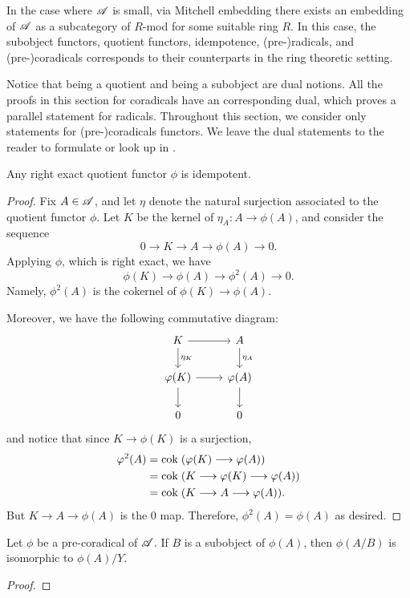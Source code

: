 \begin{rmk}
In the case where $\mathscr{A}$ is small, via Mitchell embedding 
there exists an embedding of $\mathscr{A}$ as a subcategory of $R$-mod
for some suitable ring $R$. In this case, the subobject functors, 
quotient functors, idempotence, (pre-)radicals, and 
(pre-)coradicals corresponds to their counterparts in the ring 
theoretic setting.
\end{rmk}

\begin{rmk}
Notice that being a quotient and being a subobject are dual 
notions. All the proofs in this section for coradicals have an 
corresponding dual, which proves a parallel statement for radicals.
Throughout this section, we consider only statements for 
(pre-)coradicals functors. We leave the dual statements to the 
reader to formulate or look up in \cite{DTor}.
\end{rmk}

\begin{prop}
Any right exact quotient functor $\phi$ is idempotent. 
\end{prop}
\begin{proof}
Fix $A \in \mathscr{A}$, and let $\eta$ denote the natural surjection 
associated to the quotient functor $\phi$. Let $K$ be the kernel 
of $\eta_A: A \to \phi(A)$, and consider the sequence
\[
0 \to K \to A \to \phi(A) \to 0.
\]
Applying $\phi$, which is right exact, we have
\[
\phi(K) \to \phi(A) \to \phi^2(A) \to 0.
\]
Namely, $\phi^2(A)$ is the cokernel of $\phi(K) \to \phi(A)$.

Moreover, we have the following commutative diagram:
\[
\begin{tikzcd}
K \arrow{r} \arrow{d}{\eta_K} &
A \arrow{d}{\eta_A} \\
\phi(K) \arrow{r} \arrow{d} &
\phi(A) \arrow{d} \\
0 & 0
\end{tikzcd}
\]
and notice that since $K \to \phi(K)$ is a surjection,
\begin{align*}
\varphi^2(A) &= \mathrm{cok}\; (\varphi(K) \longrightarrow \varphi(A)) \\
          &= \mathrm{cok}\; (K \longrightarrow \varphi(K) \longrightarrow \varphi(A)) \\
          &= \mathrm{cok}\; (K \longrightarrow A \longrightarrow \varphi(A)).
\end{align*}
But $K \to A \to \phi(A)$ is the $0$ map. Therefore, $\phi^2(A) = 
\phi(A)$ as desired.
\end{proof}

\begin{prop}
Let $\phi$ be a pre-coradical of $\mathscr{A}$. If $B$ is a subobject 
of $\phi(A)$, then $\phi(A/B)$ is isomorphic to $\phi(A)/Y$. 
\end{prop}
\begin{proof}

\end{proof}
